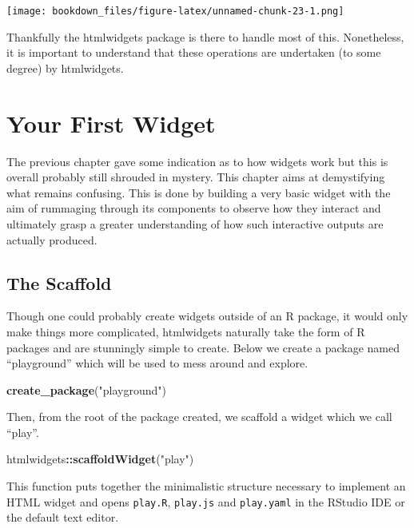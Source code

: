 \documentclass[
]{krantz}
\makeatletter
\newenvironment{Shaded}{\begin{snugshade}}{\end{snugshade}}
\newcommand{\KeywordTok}[1]{\textcolor[rgb]{0.27,0.27,0.27}{\textbf{#1}}}
\newcommand{\NormalTok}[1]{#1}
\newcommand{\OperatorTok}[1]{\textcolor[rgb]{0.43,0.43,0.43}{\textbf{#1}}}
\newcommand{\StringTok}[1]{\textcolor[rgb]{0.5,0.5,0.5}{#1}}
\newenvironment{kframe}{%
\medskip{}
\setlength{\fboxsep}{.8em}
 \def\at@end@of@kframe{}%
 \ifinner\ifhmode%
  \def\at@end@of@kframe{\end{minipage}}%
  \begin{minipage}{\columnwidth}%
 \fi\fi%
 \def\FrameCommand##1{\hskip\@totalleftmargin \hskip-\fboxsep
 \colorbox{shadecolor}{##1}\hskip-\fboxsep
     \hskip-\linewidth \hskip-\@totalleftmargin \hskip\columnwidth}%
 \MakeFramed {\advance\hsize-\width
   \@totalleftmargin\z@ \linewidth\hsize
   \@setminipage}}%
 {\par\unskip\endMakeFramed%
 \at@end@of@kframe}
\renewenvironment{Shaded}{\begin{kframe}}{\end{kframe}}
\makeatother
\begin{document}
\texttt{[image: bookdown\_files/figure-latex/unnamed-chunk-23-1.png]}

Thankfully the htmlwidgets package is there to handle most of this. Nonetheless, it is important to understand that these operations are undertaken (to some degree) by htmlwidgets.

\hypertarget{your-first-widget}{%
\chapter{Your First Widget}\label{your-first-widget}}

The previous chapter gave some indication as to how widgets work but this is overall probably still shrouded in mystery. This chapter aims at demystifying what remains confusing. This is done by building a very basic widget with the aim of rummaging through its components to observe how they interact and ultimately grasp a greater understanding of how such interactive outputs are actually produced.

\hypertarget{the-scaffold}{%
\section{The Scaffold}\label{the-scaffold}}

Though one could probably create widgets outside of an R package, it would only make things more complicated, htmlwidgets naturally take the form of R packages and are stunningly simple to create. Below we create a package named ``playground'' which will be used to mess around and explore.

\begin{Shaded}
\begin{Highlighting}[]
\KeywordTok{create\_package}\NormalTok{(}\StringTok{"playground"}\NormalTok{)}
\end{Highlighting}
\end{Shaded}

Then, from the root of the package created, we scaffold a widget which we call ``play''.

\begin{Shaded}
\begin{Highlighting}[]
\NormalTok{htmlwidgets}\OperatorTok{::}\KeywordTok{scaffoldWidget}\NormalTok{(}\StringTok{"play"}\NormalTok{)}
\end{Highlighting}
\end{Shaded}

This function puts together the minimalistic structure necessary to implement an HTML widget and opens \texttt{play.R}, \texttt{play.js} and \texttt{play.yaml} in the RStudio IDE or the default text editor.
\end{document}
